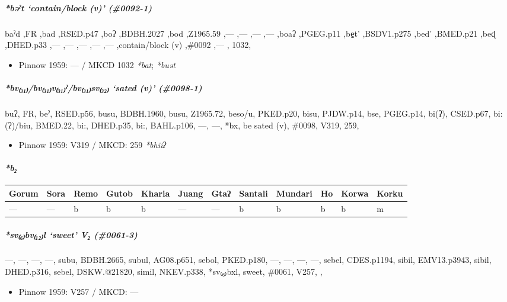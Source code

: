 \documentclass[a4paper,]{article}
\providecommand{\tightlist}{%
  \setlength{\itemsep}{0pt}\setlength{\parskip}{0pt}}
\let\oldparagraph\paragraph
\renewcommand{\paragraph}[1]{\oldparagraph{#1}\mbox{}}
\let\oldsubparagraph\subparagraph
\renewcommand{\subparagraph}[1]{\oldsubparagraph{#1}\mbox{}}
\begin{document}
\subparagraph{\texorpdfstring{\emph{*bəˀt} `contain/block (v)'
(\#0092-1)}{*bəˀt contain/block (v) (\#0092-1)}}\label{bux259ux2c0t-containblock-v-0092-1}

baˀd ,FR ,bad ,RSED.p47 ,boʔ ,BDBH.2027 ,bod ,Z1965.59 ,--- ,--- ,---
,--- ,boaʔ ,PGEG.p11 ,be̠t' ,BSDV1.p275 ,bed' ,BMED.p21 ,beɖ ,DHED.p33
,--- ,--- ,--- ,--- ,--- ,contain/block (v) ,\#0092 ,--- , 1032,

\begin{itemize}
\tightlist
\item
  Pinnow 1959: --- / MKCD 1032 \emph{*bat}; \emph{*buət}
\end{itemize}

\subparagraph{\texorpdfstring{\emph{*bv₍₃₁₎/bv₍₃₁₎v₍₃₁₎ˀ/bv₍₃₁₎sv₍₃₂₎}
`sated (v)'
(\#0098-1)}{*bv₍₃₁₎/bv₍₃₁₎v₍₃₁₎ˀ/bv₍₃₁₎sv₍₃₂₎ sated (v) (\#0098-1)}}\label{bvbvvux2c0bvsv-sated-v-0098-1}

buʔ, FR, beˀ, RSED.p56, busu, BDBH.1960, busu, Z1965.72, beso/u,
PKED.p20, bisu, PJDW.p14, bse, PGEG.p14, bi(ʔ), CSED.p67, bi:(ʔ)/biu,
BMED.22, bi:, DHED.p35, bi:, BAHL.p106, ---, ---, *bx, be sated (v),
\#0098, V319, 259,

\begin{itemize}
\tightlist
\item
  Pinnow 1959: V319 / MKCD: 259 \emph{*bhiiʔ}
\end{itemize}

\paragraph{\texorpdfstring{\emph{*b₂}}{*b₂}}\label{b-1}

\begin{longtable}[]{@{}llllllllllll@{}}
\toprule
Gorum & Sora & Remo & Gutob & Kharia & Juang & Gtaʔ & Santali & Mundari
& Ho & Korwa & Korku\tabularnewline
\midrule
\endhead
--- & --- & b & b & b & --- & --- & b & b & b & b & m\tabularnewline
\bottomrule
\end{longtable}

\subparagraph{\texorpdfstring{\emph{*sv₍₆₎bv₍₁₂₎l} `sweet' V₂
(\#0061-3)}{*sv₍₆₎bv₍₁₂₎l sweet V₂ (\#0061-3)}}\label{svbvl-sweet-v-0061-3}

---, ---, ---, ---, subu, BDBH.2665, subul, AG08.p651, sebol, PKED.p180,
---, ---, ―, ---, sebel, CDES.p1194, sibil, EMV13.p3943, sibil,
DHED.p316, sebel, DSKW.@21820, simil, NKEV.p338, *sv₍₆₎bxl, sweet,
\#0061, V257, ,

\begin{itemize}
\tightlist
\item
  Pinnow 1959: V257 / MKCD: ---
\end{itemize}
\end{document}
